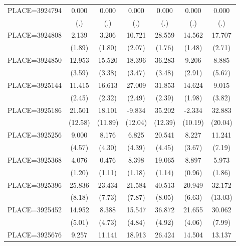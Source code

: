 {\begin{tabular}{l*{6}{c}}
PLACE=3924794       &       0.000&       0.000&       0.000&       0.000&       0.000&       0.000\\
                    &         (.)&         (.)&         (.)&         (.)&         (.)&         (.)\\
PLACE=3924808       &       2.139&       3.206&      10.721&      28.559&      14.562&      17.707\\
                    &      (1.89)&      (1.80)&      (2.07)&      (1.76)&      (1.48)&      (2.71)\\
PLACE=3924850       &      12.953&      15.520&      18.396&      36.283&       9.206&       8.885\\
                    &      (3.59)&      (3.38)&      (3.47)&      (3.48)&      (2.91)&      (5.67)\\
PLACE=3925144       &      11.415&      16.613&      27.009&      31.853&      14.624&       9.015\\
                    &      (2.45)&      (2.32)&      (2.49)&      (2.39)&      (1.98)&      (3.82)\\
PLACE=3925186       &      21.501&      18.101&      -9.834&      35.202&      -2.334&      32.883\\
                    &     (12.58)&     (11.89)&     (12.04)&     (12.39)&     (10.19)&     (20.04)\\
PLACE=3925256       &       9.000&       8.176&       6.825&      20.541&       8.227&      11.241\\
                    &      (4.57)&      (4.30)&      (4.39)&      (4.45)&      (3.67)&      (7.19)\\
PLACE=3925368       &       4.076&       0.476&       8.398&      19.065&       8.897&       5.973\\
                    &      (1.20)&      (1.11)&      (1.18)&      (1.14)&      (0.96)&      (1.86)\\
PLACE=3925396       &      25.836&      23.434&      21.584&      40.513&      20.949&      32.172\\
                    &      (8.18)&      (7.73)&      (7.87)&      (8.05)&      (6.63)&     (13.03)\\
PLACE=3925452       &      14.952&       8.388&      15.547&      36.872&      21.655&      30.062\\
                    &      (5.01)&      (4.73)&      (4.84)&      (4.92)&      (4.06)&      (7.99)\\
PLACE=3925676       &       9.257&      11.141&      18.913&      26.424&      14.504&      13.137\\

\end{tabular}}
